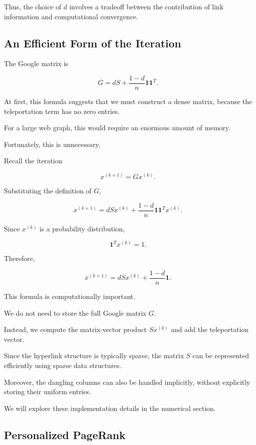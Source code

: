 \documentclass[11pt,a4paper]{article}
\theoremstyle{definition}
\theoremstyle{remark}
\begin{document}
Thus, the choice of $d$
involves a tradeoff
between the contribution
of link information
and computational convergence.


\subsection{An Efficient Form of the Iteration}

The Google matrix is

\[
G=
dS+
\frac{1-d}{n}
\mathbf{1}\mathbf{1}^T.
\]

At first, this formula
suggests that we must
construct a dense matrix,
because the teleportation
term has no zero entries.

For a large web graph,
this would require
an enormous amount
of memory.

Fortunately, this is
unnecessary.

Recall the iteration

\[
x^{(k+1)}=Gx^{(k)}.
\]

Substituting the
definition of $G$,

\[
x^{(k+1)}
=
dSx^{(k)}
+
\frac{1-d}{n}
\mathbf{1}\mathbf{1}^Tx^{(k)}.
\]

Since $x^{(k)}$
is a probability
distribution,

\[
\mathbf{1}^Tx^{(k)}=1.
\]

Therefore,

\begin{equation}
\boxed{
x^{(k+1)}
=
dSx^{(k)}
+
\frac{1-d}{n}\mathbf{1}.
}
\label{eq:pagerank_sparse_iteration}
\end{equation}

This formula is
computationally important.

We do not need to
store the full
Google matrix $G$.

Instead, we compute
the matrix-vector product
$Sx^{(k)}$ and add
the teleportation vector.

Since the hyperlink
structure is typically
sparse, the matrix $S$
can be represented
efficiently using
sparse data structures.

Moreover, the dangling
columns can also be
handled implicitly,
without explicitly
storing their uniform
entries.

We will explore these
implementation details
in the numerical section.


\subsection{Personalized PageRank}
\end{document}
